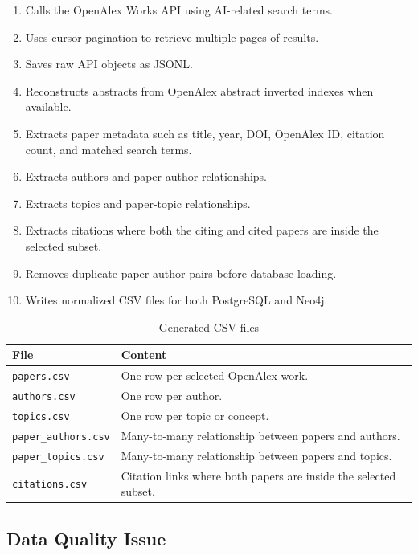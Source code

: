 \documentclass[11pt]{article}
\begin{document}
\begin{enumerate}
    \item Calls the OpenAlex Works API using AI-related search terms.
    \item Uses cursor pagination to retrieve multiple pages of results.
    \item Saves raw API objects as JSONL.
    \item Reconstructs abstracts from OpenAlex abstract inverted indexes when available.
    \item Extracts paper metadata such as title, year, DOI, OpenAlex ID, citation count, and matched search terms.
    \item Extracts authors and paper-author relationships.
    \item Extracts topics and paper-topic relationships.
    \item Extracts citations where both the citing and cited papers are inside the selected subset.
    \item Removes duplicate paper-author pairs before database loading.
    \item Writes normalized CSV files for both PostgreSQL and Neo4j.
\end{enumerate}

\begin{table}[h]
\centering
\caption{Generated CSV files}
\label{tab:csv-files}
\begin{tabular}{|p{}|p{}|}
\hline
\textbf{File} & \textbf{Content} \\
\hline
\texttt{papers.csv} & One row per selected OpenAlex work. \\
\hline
\texttt{authors.csv} & One row per author. \\
\hline
\texttt{topics.csv} & One row per topic or concept. \\
\hline
\texttt{paper\_authors.csv} & Many-to-many relationship between papers and authors. \\
\hline
\texttt{paper\_topics.csv} & Many-to-many relationship between papers and topics. \\
\hline
\texttt{citations.csv} & Citation links where both papers are inside the selected subset. \\
\hline
\end{tabular}
\end{table}

\subsection{Data Quality Issue}
\end{document}
